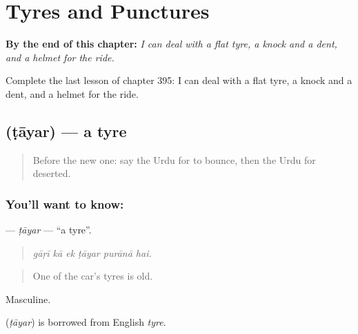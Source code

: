 
\chapter{Tyres and Punctures}
\label{ch:ur-tyres-and-punctures}

\begin{chapteropening}
\textbf{By the end of this chapter:} \emph{I can deal with a flat tyre, a knock and a dent, and a helmet for the ride.}

Complete the last lesson of chapter 395: I can deal with a flat tyre, a knock and a dent, and a helmet for the ride.
\end{chapteropening}

\section[\texorpdfstring{\ur{ٹائر} (ṭāyar)}{ٹائر (ṭāyar)}]{ (ṭāyar) — a tyre}

\label{lesson:UR-C395-tayar}



\begin{quote}
Before the new one: say the Urdu for to bounce, then the Urdu for deserted.
\end{quote}

\subsection*{You'll want to know: }
\textbf{} — \emph{ṭāyar} — \textquotedblleft{}a tyre\textquotedblright{}.

\begin{quote}
     
\end{quote}

\begin{quote}
\emph{gāṛī kā ek ṭāyar purānā hai.}
\end{quote}

\begin{quote}
One of the car's tyres is old.
\end{quote}

Masculine.

\begin{cousinweb}
\textbf{} (\emph{ṭāyar}) is borrowed from English \emph{tyre}.
\end{cousinweb}

